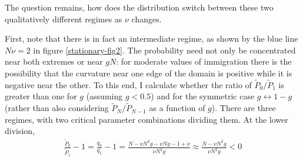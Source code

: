The question remains, how does the distribution switch between these two qualitatively different regimes as $\nu$ changes. 
\iffalse
To observe this I calculate the curvature of the extremum point. 
It goes from positive to negative as the immigration rate is increased, and there must be a critical value at which it changes sign. 
This is found when $\partial_n^2 q_n=0$. 
I note that $\partial_n^2 q_n=\partial_n \big(q_n \partial_n \ln[q_n] \big) = q_n \big( (\partial_n \ln[q_n])^2 + \partial_n^2 \ln[q_n] \big)$. 
$q_n>0$ and $\partial_n \ln[q_n]=0$ at the extremum so an equivalent problem is to find the parameter values that make $\partial_n^2 \ln[q_n]=0$ at the extremum. 
\begin{align*}
 \partial_n^2 \ln[q_n] &= \frac{\gamma}{f-1} + \frac{\gamma}{f-\gamma+\epsilon g} + \frac{\gamma}{\gamma-f} + \frac{\gamma}{1-f+\epsilon(1-g)} + \frac{2\gamma^2}{f\big(1-f+\epsilon(1-g)\big)} + \frac{\gamma^2\big(2f-1-\epsilon(1-g)\big)}{f\big(1-f+\epsilon(1-g)\big)^2} + \frac{\gamma^2\big(1-2f+\epsilon(1-g)\big)}{f^2\big(1-f+\epsilon(1-g)\big)}
\end{align*}
Substituting $f^*$ and expanding to lowest order makes the sign proportional to
\begin{equation*}
 4 - 2\epsilon/\gamma - \big(1-4g(1-g)\big)\big(\epsilon/\gamma\big)^2
\end{equation*}
\fi
First, note that there is in fact an intermediate regime, as shown by the blue line $N\nu=2$ in figure \ref{stationary-fig2}. 
The probability need not only be concentrated near both extremes or near $gN$:
for moderate values of immigration there is the possibility that the curvature near one edge of the domain is positive while it is negative near the other. 
To this end, I calculate whether the ratio of $\widetilde{P}_0/\widetilde{P}_1$ is greater than one for $g$ (assuming $g<0.5$) and for the symmetric case $g\leftrightarrow 1-g$ (rather than also considering $\widetilde{P}_N/\widetilde{P}_{N-1}$ as a function of $g$). 
There are three regimes, with two critical parameter combinations dividing them. 
At the lower division,
\begin{align}
 \frac{\widetilde{P}_0}{\widetilde{P}_1} - 1 = \frac{q_0}{q_1} - 1 = \frac{N - \nu N^2 g - \nu N g - 1 + \nu}{\nu N^2 g} \approx \frac{N - \nu N^2 g}{\nu N^2 g} < 0
\end{align}
